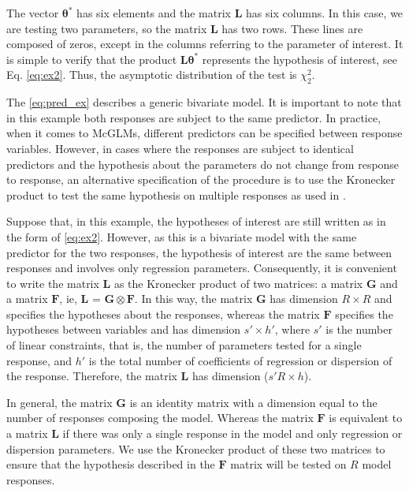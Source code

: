 \documentclass[article]{jss}\usepackage[]{graphicx}\usepackage[]{xcolor}
\begin{document}
The vector $\boldsymbol{\theta^{*}}$ has six elements and the matrix $\boldsymbol{L}$ has six columns. In this case, we are testing two parameters, so the matrix $\boldsymbol{L}$ has two rows. These lines are composed of zeros, except in the columns referring to the parameter of interest. It is simple to verify that the product $\boldsymbol{L}\boldsymbol{\theta^{*}}$ represents the hypothesis of interest, see Eq. \autoref{eq:ex2}. 
Thus, the asymptotic distribution of the test is $\chi^2_2$.

The \autoref{eq:pred_ex} describes a generic bivariate model. It is important to note that in this example both responses are subject to the same predictor. In practice, when it comes to McGLMs, different predictors can be specified between response variables. However, in cases where the responses are subject to identical predictors and the hypothesis about the parameters do not change from response to response, an alternative specification of the procedure is to use the Kronecker product to test the same hypothesis on multiple responses as used in \citet{plastica}.

Suppose that, in this example, the hypotheses of interest are still written as in the form of \autoref{eq:ex2}. However, as this is a bivariate model with the same predictor for the two responses, the hypothesis of interest are the same between responses and involves only regression parameters. Consequently, it is convenient to write the matrix $\boldsymbol{L}$ as the Kronecker product of two matrices: a matrix $\boldsymbol{G}$ and a matrix $\boldsymbol{F}$, ie, $\boldsymbol{L}$ = $\boldsymbol{G} \otimes \boldsymbol{F}$. In this way, the matrix $\boldsymbol{G}$ has dimension $R \times R$ and specifies the hypotheses about the responses, whereas the matrix $\boldsymbol{F}$ specifies the hypotheses between variables and has dimension ${s}' \times {h}'$, where ${s}'$ is the number of linear constraints, that is, the number of parameters tested for a single response, and ${h}'$ is the total number of coefficients of regression or dispersion of the response. Therefore, the matrix $\boldsymbol{L}$ has dimension (${s}'R \times h$).

In general, the matrix $\boldsymbol{G}$ is an identity matrix with a dimension equal to the number of responses composing the model. Whereas the matrix $\boldsymbol{F}$ is equivalent to a matrix $\boldsymbol{L}$ if there was only a single response in the model and only regression or dispersion parameters. We use the Kronecker product of these two matrices to ensure that the hypothesis described in the $\boldsymbol{F}$ matrix will be tested on $R$ model responses.
\end{document}
